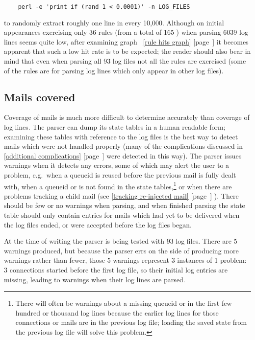 \documentclass[a4paper,12pt,draft]{article}
\newcommand{\refwithpage}[1]{%
    \empty{}\ref{#1} [page~\pageref{#1}]%
}
\newcommand{\sectionref}[1]{%
    \textsection{}\refwithpage{#1}%
}
\newcommand{\numberOFlogFILES}[0]{%
    93%
}
\newcommand{\numberOFrules}[0]{%
    165%
}
\begin{document}
\verb!    perl -e 'print if (rand 1 < 0.0001)' -n LOG_FILES!

\noindent{}to randomly extract roughly one line in every 10,000.  Although
on initial appearances exercising only 36 rules (from a total of
\numberOFrules{}) when parsing 6039 log lines seems quite low, after
examining graph~\refwithpage{rule hits graph} it becomes apparent that such
a low hit rate is to be expected; the reader should also bear in mind that
even when parsing all \numberOFlogFILES{} log files not all the rules are
exercised (some of the rules are for parsing log lines which only appear in
other log files).

\subsection{Mails covered}

\label{mails-covered}

Coverage of mails is much more difficult to determine accurately than
coverage of log lines.  The parser can dump its state tables in a human
readable form; examining these tables with reference to the log files is
the best way to detect mails which were not handled properly (many of the
complications discussed in \sectionref{additional complications} were
detected in this way).  The parser issues warnings when it detects any
errors, some of which may alert the user to a problem, e.g.\ when a queueid
is reused before the previous mail is fully dealt with, when a queueid or
\pid{} is not found in the state tables,\footnote{There will often be
warnings about a missing queueid or \pid{} in the first few hundred or
thousand log lines because the earlier log lines for those connections or
mails are in the previous log file; loading the saved state from the
previous log file will solve this problem.} or when there are problems
tracking a child mail (see \sectionref{tracking re-injected mail}).  There
should be few or no warnings when parsing, and when finished parsing the
state table should only contain entries for mails which had yet to be
delivered when the log files ended, or were accepted before the log files
began.

At the time of writing the parser is being tested with \numberOFlogFILES{}
log files.  There are 5 warnings produced, but because the parser errs on
the side of producing more warnings rather than fewer, those 5 warnings
represent 3 instances of 1 problem: 3 connections started before the first
log file, so their initial log entries are missing, leading to warnings
when their log lines are parsed.
\end{document}
